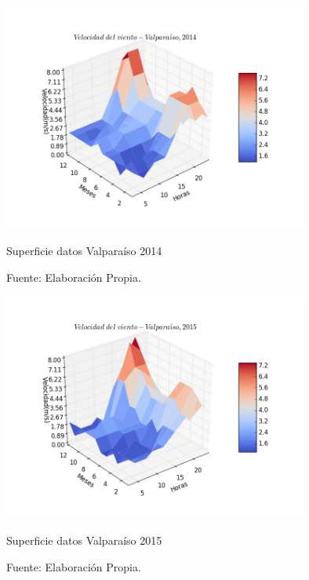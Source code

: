 \begin{figure}[H]
    \centering
    \includegraphics[height=75mm]{figures/3d_data_2014.png}
    \caption{Superficie datos Valparaíso 2014}
    \vspace{-.25cm}
    \caption*{Fuente: Elaboración Propia.}
    \label{fig:data_valpo_14}
\end{figure}
\begin{figure}[H]
    \centering
    \includegraphics[height=75mm]{figures/3d_data_2015.png}
    \caption{Superficie datos Valparaíso 2015}
    \vspace{-.25cm}
    \caption*{Fuente: Elaboración Propia.}
    \label{fig:data_valpo_15}
\end{figure}

